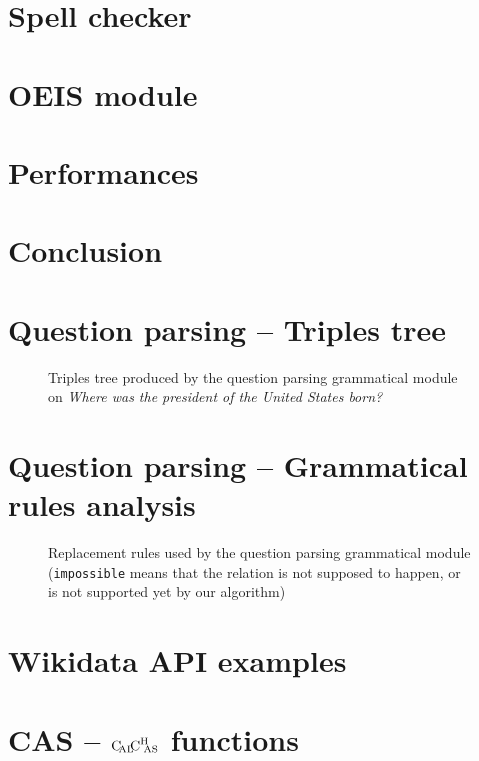 \documentclass[a4paper,10pt]{report}
\begin{document}
\chapter{Spell checker}
    \label{spellchecker}
    

\chapter{OEIS module}
    

\chapter{Performances}
    \label{performances}
    

\chapter*{Conclusion}
    \label{conclusion}
    



\nocite{*}

\appendix

\chapter{Question parsing \--- Triples tree}

\begin{figure}[!ht]

\caption{Triples tree produced by the question parsing grammatical module on \textit{Where was the president of the United States born?}}
\label{triple_tree}
\end{figure}

\chapter{Question parsing \--- Grammatical rules analysis}

\begin{figure}[!ht]

\caption{Replacement rules used by the question parsing grammatical module (\texttt{impossible} means that the relation is not supposed to happen, or is not supported yet by our algorithm)}
\label{gramm_rule}
\end{figure}

\chapter{Wikidata API examples}


\chapter{CAS \--- \texorpdfstring{$\text{C}\hspace{-2pt}_{\text{AL}}\hspace{-3pt}\text{C}^{\text{H}}{\hspace{-4pt}}_\text{AS}$}{CalChAS} functions}
    
\end{document}
